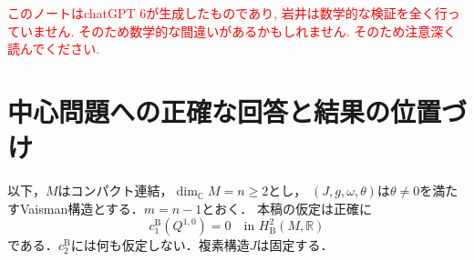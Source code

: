 \documentclass[12pt]{amsart}
\makeatletter
\theoremstyle{definition}
\theoremstyle{remark}
\numberwithin{equation}{section}
\newcommand{\R}{\mathbb{R}}
\newcommand{\C}{\mathbb{C}}
\newcommand{\xr}[1]{\textcolor{red}{#1}}
\newcommand{\bas}{\mathrm{B}}
\newcommand{\MergeLanguage}{en}
\renewcommand*{\HyperDestNameFilter}[1]{\MergeLanguage.#1}
\renewcommand*{\pdfbookmark}[3][0]{%
  \bookmark[level=#1,dest={\HyperDestNameFilter{#3.#1}}]{#2}%
  \hyper@anchorstart{#3.#1}\hyper@anchorend}
\makeatother
\begin{document}
\date{8 September 2026, working note, version 0.1}
\renewcommand{\subjclassname}{\textup{2020} Mathematics Subject Classification}


\pdfbookmark[0]{日本語版}{language-ja}

\begin{abstract}
コンパクト非K\"ahler Vaisman多様体について，第一実basic Chern類の消滅は，
複素多様体自身の第一Bott--Chern類の消滅と同値である．本稿では，葉空間の存在を
仮定せずにこの同値を説明し，Istratiの既存の構造定理を適用する．得られる
Beauville--Bogomolov分解は横断幾何と葉空間の有限orbifold被覆に関するものであり，
全空間はdefiniteな楕円曲線orbi-bundleとして残る．第一Betti数とvirtual第一Betti数を
計算し，基本群とAlbanese写像を記述するとともに，第一Betti数が小さい具体例を与える．
さらに，束の再構成，積分解の障害，第二basic Chern類の消滅に関する初等的な帰結を示す．
本稿は解説的な作業ノートであり，新しい分解定理や確認済みの新規性を主張しない．
\end{abstract}
\maketitle
\xr{このノートはchatGPT 6が生成したものであり, 岩井は数学的な検証を全く行っていません. そのため数学的な間違いがあるかもしれません. そのため注意深く読んでください.}
\tableofcontents

\section{中心問題への正確な回答と結果の位置づけ}\label{sec:intro}
以下，$M$はコンパクト連結，$\dim_{\C}M=n\geq2$とし，
$(J,g,\omega,\theta)$は$\theta\ne0$を満たすVaisman構造とする．$m=n-1$とおく．
本稿の仮定は正確に
\begin{equation}\label{eq:hyp}
c_1^{\bas}(Q^{1,0})=0\quad\text{in }H^2_{\bas}(M,\R)
\end{equation}
である．$c_2^{\bas}$には何も仮定しない．複素構造$J$は固定する．
\end{document}
